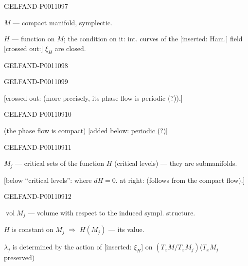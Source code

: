\begin{GelfandAdjacentEvidence}{GELFAND-P001109}{7}


$M$ — compact manifold, symplectic.

$H$ — function on $M$; the condition on it: int. curves of the
[inserted: Ham.] field [crossed out:] $\xi_H$ are closed.
\end{GelfandAdjacentEvidence}
\begin{GelfandAdjacentEvidence}{GELFAND-P001109}{8}

\end{GelfandAdjacentEvidence}
\begin{GelfandAdjacentEvidence}{GELFAND-P001109}{9}


[crossed out: \sout{(more precisely, its phase flow is periodic (?))}.]
\end{GelfandAdjacentEvidence}
\begin{GelfandAdjacentEvidence}{GELFAND-P001109}{10}


(the phase flow is compact)
[added below: \underline{periodic (?)}]
\end{GelfandAdjacentEvidence}
\begin{GelfandAdjacentEvidence}{GELFAND-P001109}{11}


$M_j$ — critical sets of the function $H$ (critical levels) — they are submanifolds.

[below “critical levels”: where $dH=0$. at right: (follows from the compact flow).]
\end{GelfandAdjacentEvidence}
\begin{GelfandAdjacentEvidence}{GELFAND-P001109}{12}


$\operatorname{vol} M_j$ — volume with respect to the induced sympl. structure.

$H$ is constant on $M_j$ $\Rightarrow$ $H(M_j)$ — its value.

$\lambda_j$ is determined by the action of [inserted: $\xi_H$] on
$\left(T_xM/T_xM_j\right)$\qquad($T_xM_j$ preserved)
\end{GelfandAdjacentEvidence}
